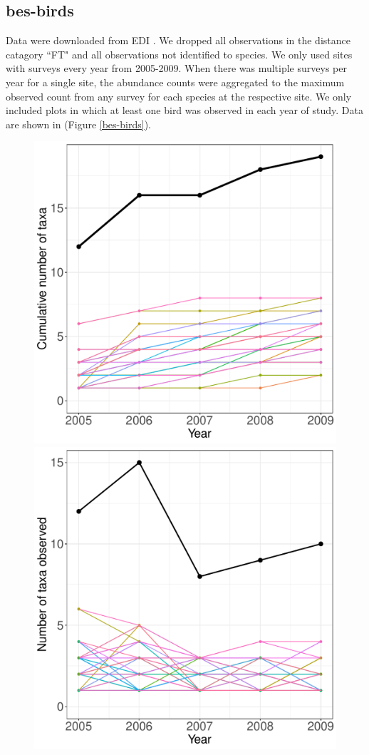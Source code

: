 \documentclass[11pt, oneside]{article}
\begin{document}
\subsection{bes-birds}
Data were downloaded from EDI \citep{bes-birds}. We dropped all observations in the distance catagory ``FT" and all observations not identified to species. 
We only used sites with surveys every year from 2005-2009. 
When there was multiple surveys per year for a single site, the abundance counts were aggregated to the maximum observed count from any survey for each species at the respective site.
We only included plots in which at least one bird was observed in each year of study.
Data are shown in (Figure \ref{bes-birds}).
\begin{figure}[h!]
\centering
\includegraphics[scale = 0.4]{bes-birds-nilon_species_accumulation_curve.pdf}
\includegraphics[scale = 0.4]{bes-birds-nilon_num_taxa_over_time.pdf}

\end{figure}
\end{document}
